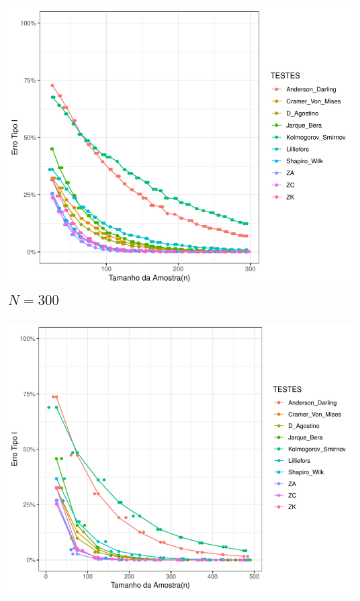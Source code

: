 \documentclass[final]{beamer}
\begin{document}
\begin{frame}[t]
\begin{columns}[t,totalwidth=0.6\paperwidth]
\begin{column}{0.45\textwidth}
\begin{figure}[H]
    \centering
    \begin{subfigure}[b]{0.3\textwidth}
        \centering
        \includegraphics[width=\textwidth]{Distribuição_Beta/Erro_TipoI/erro_tipo_I_beta_300.pdf}
        \caption{\(N = 300\)}
        \label{fig:beta_30}
    \end{subfigure}
    \hfill
    \begin{subfigure}[b]{0.3\textwidth}
        \centering
        \includegraphics[width=\textwidth]{Distribuição_Beta/Erro_TipoI/erro_tipo_I_beta_500.pdf}

\end{subfigure}
\end{figure}
\end{column}
\end{columns}
\end{frame}
\end{document}
